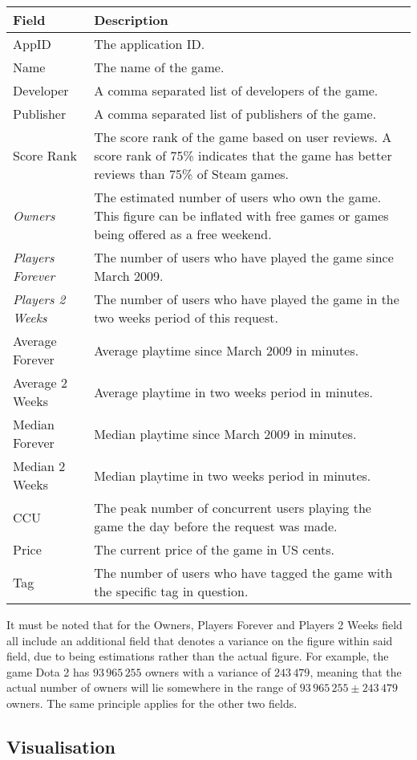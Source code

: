 \documentclass[dataset.tex]{subfiles}
\begin{document}
\begin{table}[H]
	\centering
	\begin{tabularx}{\textwidth}{|l|X|}
		\hline
		Field & Description \\
		\hline
		AppID & The application ID. \\
		\hline
		Name & The name of the game. \\
		\hline
		Developer & A comma separated list of developers of the game. \\
		\hline
		Publisher & A comma separated list of publishers of the game. \\
		\hline
		Score Rank & The score rank of the game based on user reviews. A score
		rank of 75\% indicates that the game has better reviews than 75\% of
		Steam games. \\
		\hline
		\emph{Owners} & The estimated number of users who own the game. This
		figure can be inflated with free games or games being offered as a free
		weekend. \\
		\hline
		\emph{Players Forever} & The number of users who have played the game
		since March 2009. \\
		\hline
		\emph{Players 2 Weeks} & The number of users who have played the game in
		the two weeks period of this request. \\
		\hline
		Average Forever & Average playtime since March 2009 in minutes.\\
		\hline
		Average 2 Weeks & Average playtime in two weeks period in minutes. \\
		\hline
		Median Forever & Median playtime since March 2009 in minutes. \\
		\hline
		Median 2 Weeks & Median playtime in two weeks period in minutes. \\
		\hline
		CCU & The peak number of concurrent users playing the game the day
		before the request was made. \\
		\hline
		Price & The current price of the game in US cents. \\
		\hline
		Tag & The number of users who have tagged the game with the specific
		tag in question. \\
		\hline
	\end{tabularx}
	\vspace{1ex}
\end{table}

It must be noted that for the Owners, Players Forever and Players 2 Weeks field
all include an additional field that denotes a variance on the figure within
said field, due to being estimations rather than the actual figure. For example,
the game Dota 2 has \(93\,965\,255\) owners with a variance of \(243\,479\),
meaning that the actual number of owners will lie somewhere in the range of
\(93\,965\,255 \pm 243\,479 \) owners. The same principle applies for the other
two fields.

\subsection{Visualisation} %
\label{sub:visualisation}

\end{document}
